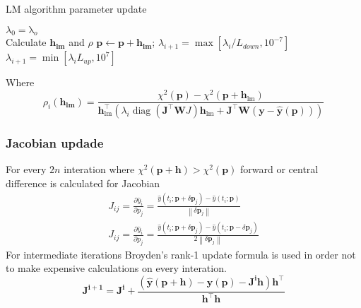 \documentclass[]{beamer}
\begin{document}
\begin{frame}
    
\begin{algorithm}[H]
    \caption{LM algorithm parameter update}
\begin{algorithmic}[1]
    \STATE $\lambda_{0} = \mathrm{\lambda}_{o}$ \\
    Calculate $\boldsymbol{h_{lm}}$ and $\rho$
        \STATE $\boldsymbol{p} \leftarrow \boldsymbol{p} + \boldsymbol{h_{lm}}$;
        \STATE $\lambda_{i+1} = \max\left[\lambda_{i}/L_{down}, 10^{-7}\right]$
    \ELSE
        \STATE $\lambda_{i+1} = \min\left[\lambda_{i} L_{up}, 10^{7}\right]$
    \ENDIF
\label{alg:seq}
\end{algorithmic}
\end{algorithm}

Where
\begin{equation*}
\rho_{i}(\boldsymbol{h_{lm}}) = \frac{\chi^{2}(\boldsymbol{p})-\chi^{2}\left(\boldsymbol{p}+\boldsymbol{h}_{\mathrm{lm}}\right)}
      {\boldsymbol{h}_{\operatorname{lm}}^{\top}\left(\lambda_{i} \operatorname{diag}\left(\boldsymbol{J}^{\top} \boldsymbol{W} J\right) \boldsymbol{h}_{\mathrm{lm}}
      +\boldsymbol{J}^{\top} \boldsymbol{W}(\boldsymbol{y}
      -\hat{\boldsymbol{y}}(\boldsymbol{p}))\right)}
\end{equation*}

   
\end{frame}

\begin{frame}
    \frametitle{Jacobian updade}

    For every $2n$ interation where $\chi^{2}(\boldsymbol{p}+\boldsymbol{h})>\chi^{2}(\boldsymbol{p})$
    forward or central difference is calculated for Jacobian
    \begin{eqnarray*}
        J_{i j}
        =\frac{\partial \hat{y}_{i}}{\partial p_{j}}
            =\frac{\hat{y}\left(t_{i} ; \boldsymbol{p}+\delta \boldsymbol{p}_{j}\right)-\hat{y}\left(t_{i} ; \boldsymbol{p}\right)}
            {\left\|\delta \boldsymbol{p}_{j}\right\|} \\
        J_{i j}=\frac{\partial \hat{y}_{i}}{\partial p_{j}}
        =\frac{\hat{y}\left(t_{i} ; \boldsymbol{p}+\delta \boldsymbol{p}_{j}\right)-\hat{y}\left(t_{i} ; \boldsymbol{p}-\delta \boldsymbol{p}_{j}\right)}
        {2\left\|\delta \boldsymbol{p}_{j}\right\|}
    \end{eqnarray*}
    For intermediate iterations Broyden's rank-1 update formula is used in order not to make expensive calculations
    on every interation.
    \begin{equation*}
        \boldsymbol{J^{i+1}}=\boldsymbol{J^{i}}+\frac{(\hat{\boldsymbol{y}}(\boldsymbol{p}
                                                                        +\boldsymbol{h})
                                    -\hat{\boldsymbol{y}}(\boldsymbol{p})-\boldsymbol{J^{i}} \boldsymbol{h}) \boldsymbol{h}^{\top}}
                            {\boldsymbol{h}^{\top} \boldsymbol{h}}
    \end{equation*}
\end{frame}
\end{document}
